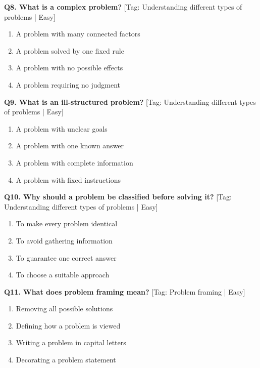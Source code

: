 \noindent\textbf{Q8. What is a complex problem?} \hfill [Tag: Understanding different types of problems | Easy]
\begin{enumerate}[label=(\alph*),topsep=2pt,itemsep=1pt,partopsep=0pt,parsep=0pt]
    \item {A problem with many connected factors}
    \item {A problem solved by one fixed rule}
    \item {A problem with no possible effects}
    \item {A problem requiring no judgment}
\end{enumerate}
\vspace{2mm}

\noindent\textbf{Q9. What is an ill-structured problem?} \hfill [Tag: Understanding different types of problems | Easy]
\begin{enumerate}[label=(\alph*),topsep=2pt,itemsep=1pt,partopsep=0pt,parsep=0pt]
    \item {A problem with unclear goals}
    \item {A problem with one known answer}
    \item {A problem with complete information}
    \item {A problem with fixed instructions}
\end{enumerate}
\vspace{2mm}

\noindent\textbf{Q10. Why should a problem be classified before solving it?} \hfill [Tag: Understanding different types of problems | Easy]
\begin{enumerate}[label=(\alph*),topsep=2pt,itemsep=1pt,partopsep=0pt,parsep=0pt]
    \item {To make every problem identical}
    \item {To avoid gathering information}
    \item {To guarantee one correct answer}
    \item {To choose a suitable approach}
\end{enumerate}
\vspace{2mm}

\noindent\textbf{Q11. What does problem framing mean?} \hfill [Tag: Problem framing | Easy]
\begin{enumerate}[label=(\alph*),topsep=2pt,itemsep=1pt,partopsep=0pt,parsep=0pt]
    \item {Removing all possible solutions}
    \item {Defining how a problem is viewed}
    \item {Writing a problem in capital letters}
    \item {Decorating a problem statement}
\end{enumerate}
\vspace{2mm}

